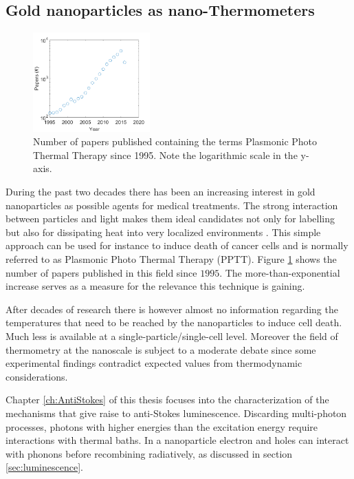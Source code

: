 \subsection{Gold nanoparticles as nano-Thermometers}
\begin{figure}[htp]
 \centering
 \includegraphics[width=0.40\textwidth]{Chapters/01_Introduction/Figures/paper_PT_therapy.png}
 \caption{Number of papers published containing the terms Plasmonic Photo
 Thermal Therapy since 1995. Note the logarithmic scale in the y-axis.}
 \label{fig:PPTT}
\end{figure}

During the past two decades there has been an increasing interest in gold
nanoparticles as possible agents for medical
treatments\cite{Gobin2007,Huang2006,Huo2014}. The strong interaction between
particles and light makes them ideal candidates not only for labelling but also
for dissipating heat into very localized environments
\cite{Huang2008,Huang2006,Gobin2007,Hirsch2003}.
This simple approach can be used for instance to induce death of cancer cells
and is normally referred to as Plasmonic Photo Thermal Therapy (PPTT). Figure
\ref{fig:PPTT} shows the number of papers published in this field since $1995$.
The more-than-exponential increase serves as a measure for the relevance this
technique is gaining.

After decades of research there is however almost no information regarding the
temperatures that need to be reached by the nanoparticles to induce cell death.
Much less is available at a single-particle/single-cell level. Moreover the
field of thermometry at the nanoscale is subject to a moderate
debate\cite{Yang2011a,Suzuki2015} since some experimental
findings\cite{Yang2011a} contradict expected values from thermodynamic
considerations\cite{Sato2014}.

Chapter \ref{ch:AntiStokes} of this thesis focuses into the characterization of
the mechanisms that give raise to anti-Stokes luminescence. Discarding
multi-photon processes, photons with higher energies than the excitation energy
require interactions with thermal baths. In a nanoparticle electron and holes
can interact with phonons before recombining radiatively, as discussed in
section \ref{sec:luminescence}.

